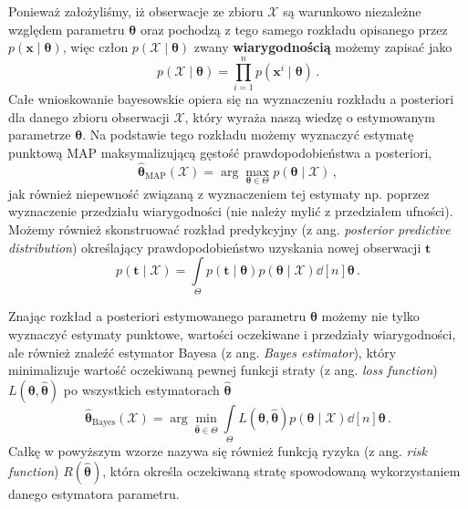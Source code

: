 \documentclass{myclass}
\numberwithin{equation}{section}
\begin{document}
Ponieważ założyliśmy, iż obserwacje ze zbioru \(\mathcal{X}\) są warunkowo niezależne względem
parametru \(\boldsymbol{\theta}\) oraz pochodzą z tego samego rozkładu opisanego przez
\(p(\mathbf{x} \mid \boldsymbol{\theta})\), więc człon \(p(\mathcal{X} \mid \boldsymbol{\theta})\)
zwany \textbf{wiarygodnością} możemy zapisać jako
\begin{equation}
    p(\mathcal{X} \mid \boldsymbol{\theta}) = \prod_{i=1}^n p(\mathbf{x}^i \mid \boldsymbol{\theta})\,.    
\end{equation}
Całe wnioskowanie bayesowskie opiera się na wyznaczeniu rozkładu a posteriori dla danego zbioru
obserwacji \(\mathcal{X}\), który wyraża naszą wiedzę o estymowanym parametrze
\(\boldsymbol{\theta}\). Na podstawie tego rozkładu możemy wyznaczyć estymatę punktową MAP
maksymalizującą gęstość prawdopodobieństwa a posteriori, 
\begin{equation}
    \boldsymbol{\hat \theta}_\mathrm{MAP}(\mathcal{X}) = \arg \max_{\boldsymbol{\theta} \in \Theta} p(\boldsymbol{\theta} \mid \mathcal{X})\,,
\end{equation}
jak również niepewność związaną z wyznaczeniem tej estymaty np. poprzez wyznaczenie przedziału
wiarygodności (nie należy mylić z przedziałem ufności). Możemy również skonstruować rozkład
predykcyjny (z ang. \textit{posterior predictive distribution}) określający prawdopodobieństwo
uzyskania nowej obserwacji \(\mathbf{t}\)\
\begin{equation}
    p(\mathbf{t} \mid \mathcal{X}) = \int\limits_\Theta p(\mathbf{t} \mid \boldsymbol{\theta}) p(\boldsymbol{\theta} \mid \mathcal{X}) \dd[n]{\boldsymbol{\theta}}\,.
\end{equation}

Znając rozkład a posteriori estymowanego parametru \(\boldsymbol{\theta}\) możemy nie tylko
wyznaczyć estymaty punktowe, wartości oczekiwane i przedziały wiarygodności, ale również znaleźć
estymator Bayesa (z ang. \textit{Bayes estimator}), który minimalizuje wartość oczekiwaną pewnej
funkcji straty (z ang. \textit{loss function}) \(L(\boldsymbol{\theta}, \boldsymbol{\hat \theta})\)
po wszystkich estymatorach \(\boldsymbol{\hat \theta}\)
\begin{equation}
    \boldsymbol{\hat \theta}_\mathrm{Bayes}(\mathcal{X}) = \arg\min_{\boldsymbol{\hat \theta} \in \Theta} \int\limits_{\Theta} L(\boldsymbol{\theta}, \boldsymbol{\hat \theta}) p(\boldsymbol{\theta} \mid \mathcal{X}) \dd[n]{\boldsymbol{\theta}}\,.
\end{equation}
Całkę w powyższym wzorze nazywa się również funkcją ryzyka (z ang. \textit{risk function})
\(R(\boldsymbol{\hat \theta})\), która określa oczekiwaną stratę spowodowaną wykorzystaniem danego
estymatora parametru.
\end{document}
